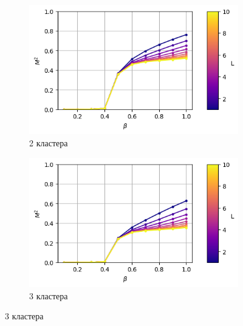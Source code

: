 \documentclass[14pt]{extarticle}
\begin{document}
\begin{figure}[ht]
	\centering
    \begin{subfigure}[t]{0.3\textwidth}
        \includegraphics*[width=\textwidth]{../images/magnetization_clusterized_W20_H50_N2.png}
        \caption*{2 кластера}
    \end{subfigure}
    \begin{subfigure}[t]{0.3\textwidth}
        \includegraphics*[width=\textwidth]{../images/magnetization_clusterized_W20_H50_N3.png}
        \caption*{3 кластера}


\end{subfigure}
\end{figure}
\end{document}
